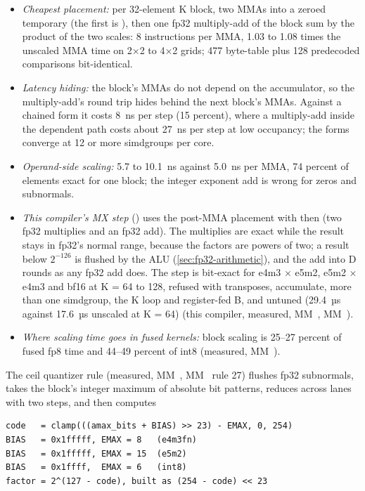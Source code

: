 \begin{itemize}
\item \emph{Cheapest placement:} per 32-element K block, two MMAs into a zeroed temporary (the first is ), then one
  fp32 multiply-add of the block sum by the product of the two scales: 8 instructions per MMA, 1.03 to 1.08 times the
  unscaled MMA time on 2×2 to 4×2 grids; 477 byte-table plus 128 predecoded comparisons bit-identical.
\item \emph{Latency hiding:} the block's MMAs do not depend on the accumulator, so the multiply-add's round trip hides behind
  the next block's MMAs. Against a chained form it costs 8~ns per step (15 percent), where a multiply-add inside the
  dependent path costs about 27~ns per step at low occupancy; the forms converge at 12 or more simdgroups per core.
\item \emph{Operand-side scaling:} 5.7 to 10.1~ns against 5.0~ns per MMA, 74 percent of elements exact for one block;
  the integer exponent add is wrong for zeros and subnormals.
\item \emph{This compiler's MX step} () uses the post-MMA placement with  then  (two fp32
  multiplies and an fp32 add). The multiplies are exact while the result stays in fp32's normal range, because the
  factors are powers of two; a result below $2^{-126}$ is flushed by the ALU (\cref{sec:fp32-arithmetic}), and the add
  into D rounds as any fp32 add does. The step is bit-exact for e4m3 × e5m2, e5m2 ×
  e4m3 and bf16 at K = 64 to 128, refused with transposes, accumulate, more than one simdgroup, the K loop and
  register-fed B, and untuned (29.4~µs against 17.6~µs unscaled at K = 64) (this compiler, measured, MM~,
  MM~).
\item \emph{Where scaling time goes in fused kernels:} block scaling is 25–27 percent of fused fp8 time and 44–49 percent of
  int8 (measured, MM~).
\end{itemize}

The ceil quantizer rule (measured, MM~, MM~ rule 27) flushes fp32 subnormals, takes the block's integer maximum
of absolute bit patterns, reduces across lanes with two  steps, and then computes

\begin{lstlisting}
code   = clamp(((amax_bits + BIAS) >> 23) - EMAX, 0, 254)
BIAS   = 0x1fffff, EMAX = 8   (e4m3fn)
BIAS   = 0x1fffff, EMAX = 15  (e5m2)
BIAS   = 0x1ffff,  EMAX = 6   (int8)
factor = 2^(127 - code), built as (254 - code) << 23
\end{lstlisting}

